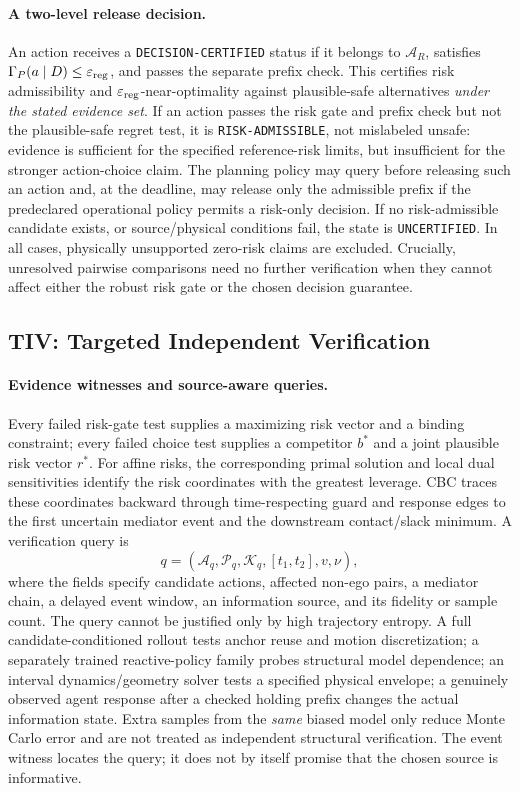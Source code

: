 \documentclass[10pt]{article}
\begin{document}
\paragraph{A two-level release decision.}
An action receives a \texttt{DECISION-CERTIFIED} status if it belongs to $\mathcal A_R$, satisfies $\Gamma_P(a\mid D)\le\varepsilon_{\rm reg}$, and passes the separate prefix check. This certifies risk admissibility and $\varepsilon_{\rm reg}$-near-optimality against plausible-safe alternatives \emph{under the stated evidence set}. If an action passes the risk gate and prefix check but not the plausible-safe regret test, it is \texttt{RISK-ADMISSIBLE}, not mislabeled unsafe: evidence is sufficient for the specified reference-risk limits, but insufficient for the stronger action-choice claim. The planning policy may query before releasing such an action and, at the deadline, may release only the admissible prefix if the predeclared operational policy permits a risk-only decision. If no risk-admissible candidate exists, or source/physical conditions fail, the state is \texttt{UNCERTIFIED}. In all cases, physically unsupported zero-risk claims are excluded. Crucially, unresolved pairwise comparisons need no further verification when they cannot affect either the robust risk gate or the chosen decision guarantee.

\subsection{TIV: Targeted Independent Verification}
\label{sec:tiv}
\paragraph{Evidence witnesses and source-aware queries.}
Every failed risk-gate test supplies a maximizing risk vector and a binding constraint; every failed choice test supplies a competitor $b^*$ and a joint plausible risk vector $r^*$. For affine risks, the corresponding primal solution and local dual sensitivities identify the risk coordinates with the greatest leverage. CBC traces these coordinates backward through time-respecting guard and response edges to the first uncertain mediator event and the downstream contact/slack minimum. A verification query is
\begin{equation}
 q=(\mathcal A_q,\mathcal P_q,\mathcal K_q,[t_1,t_2],v,\nu),
 \label{eq:query}
\end{equation}
where the fields specify candidate actions, affected non-ego pairs, a mediator chain, a delayed event window, an information source, and its fidelity or sample count. The query cannot be justified only by high trajectory entropy. A full candidate-conditioned rollout tests anchor reuse and motion discretization; a separately trained reactive-policy family probes structural model dependence; an interval dynamics/geometry solver tests a specified physical envelope; a genuinely observed agent response after a checked holding prefix changes the actual information state. Extra samples from the \emph{same} biased model only reduce Monte Carlo error and are not treated as independent structural verification. The event witness locates the query; it does not by itself promise that the chosen source is informative.
\end{document}
